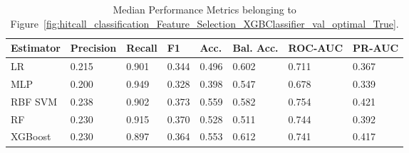 \begin{longtable}{llllllll}
\caption{Median Performance Metrics belonging to Figure~\ref{fig:hitcall_classification_Feature_Selection_XGBClassifier_val_optimal_True}.}\label{tab:table:hitcall_classification_feature_selection_xgbclassifier_val_optimal_true}\\
\toprule
\midrule
\small Estimator & \small Precision & \small Recall & \small F1 & \small Acc. & \small Bal. Acc. & \small ROC-AUC & \small PR-AUC\\
\hline
LR & 0.215 & 0.901 & 0.344 & 0.496 & 0.602 & 0.711 & 0.367\\
MLP & 0.200 & 0.949 & 0.328 & 0.398 & 0.547 & 0.678 & 0.339\\
RBF SVM & 0.238 & 0.902 & 0.373 & 0.559 & 0.582 & 0.754 & 0.421\\
RF & 0.230 & 0.915 & 0.370 & 0.528 & 0.511 & 0.744 & 0.392\\
XGBoost & 0.230 & 0.897 & 0.364 & 0.553 & 0.612 & 0.741 & 0.417\\
\bottomrule
\end{longtable}